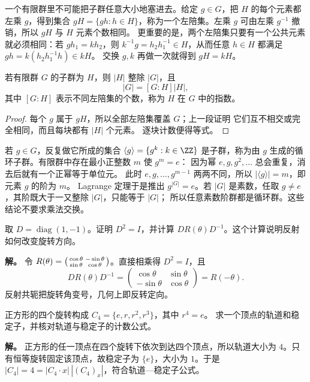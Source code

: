 一个有限群里不可能把子群任意大小地塞进去。给定 \(g\in G\)，把
\(H\) 的每个元素都左乘 \(g\)，得到集合
\(gH=\{gh:h\in H\}\)，称为一个左陪集。左乘 \(g\) 可由左乘
\(g^{-1}\) 撤销，所以 \(gH\) 与 \(H\) 元素个数相同。
更重要的是，两个左陪集只要有一个公共元素就必须相同：若
\(gh_1=kh_2\)，则 \(k^{-1}g=h_2h_1^{-1}\in H\)，从而任意
\(h\in H\) 都满足 \(gh=k(h_2h_1^{-1}h)\in kH\)。
交换 \(g,k\) 再做一次就得到 \(gH=kH\)。

\begin{theorem}[Lagrange 定理]
若有限群 \(G\) 的子群为 \(H\)，则 \(|H|\) 整除 \(|G|\)，且
\[
|G|=[G:H]|H|,
\]
其中 \([G:H]\) 表示不同左陪集的个数，称为 \(H\) 在 \(G\) 中的指数。
\end{theorem}
\begin{proof}
每个 \(g\) 属于 \(gH\)，所以全部左陪集覆盖 \(G\)；上一段证明
它们互不相交或完全相同，而且每块都有 \(|H|\) 个元素。
逐块计数便得等式。
\end{proof}

若 \(g\in G\)，反复做它所成的集合
\(\langle g\rangle=\{g^k:k\in\ZZ\}\) 是子群，称为由 \(g\)
生成的循环子群。有限群中存在最小正整数 \(m\) 使 \(g^m=e\)：
因为幂 \(e,g,g^2,\ldots\) 总会重复，消去后就有一个正幂等于单位元。
此时 \(e,g,\ldots,g^{m-1}\) 两两不同，所以
\(|\langle g\rangle|=m\)，即元素 \(g\) 的阶为 \(m\)。
Lagrange 定理于是推出 \(g^{|G|}=e\)。若 \(|G|\) 是素数，任取
\(g\ne e\)，其阶既大于一又整除 \(|G|\)，只能等于 \(|G|\)；
所以任意素数阶群都是循环群。这些结论不要求乘法交换。


\par
\begin{workedexample}
取 \(D=\operatorname{diag}(1,-1)\)。证明 \(D^2=I\)，并计算
\(DR(\theta)D^{-1}\)。这个计算说明反射如何改变旋转方向。


\textbf{解。} 令
\(R(\theta)=\begin{psmallmatrix}\cos\theta&-\sin\theta\\\sin\theta&\cos\theta\end{psmallmatrix}\)。直接相乘得 \(D^2=I\)，且
\[
DR(\theta)D^{-1}=\begin{pmatrix}\cos\theta&\sin\theta\\-\sin\theta&\cos\theta\end{pmatrix}=R(-\theta).
\]
反射共轭把旋转角变号，几何上即反转定向。
\end{workedexample}
\par

\par
\begin{workedexample}
正方形的四个旋转构成 \(C_4=\{e,r,r^2,r^3\}\)，其中 \(r^4=e\)。
求一个顶点的轨道和稳定子，并核对轨道与稳定子的计数公式。


\textbf{解。} 正方形的任一顶点在四个旋转下依次到达四个顶点，所以轨道大小为 \(4\)。只有恒等旋转固定该顶点，故稳定子为 \(\{e\}\)，大小为 \(1\)。于是 \(|C_4|=4=|C_4\cdot x|\,|(C_4)_x|\)，符合轨道—稳定子公式。
\end{workedexample}
\par
